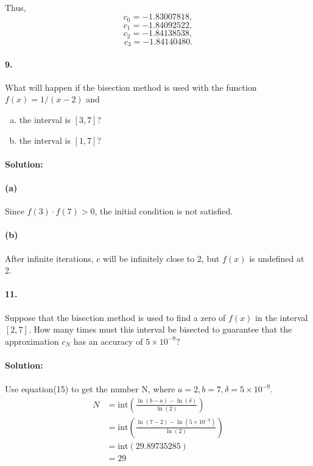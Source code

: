 \documentclass{article}  %
\begin{document}
        \paragraph{}Thus, $$c_0 = -1.83007818,$$ $$c_1 = -1.84092522,$$ $$c_2 = -1.84138538,$$ $$c_3 = -1.84140480.$$
        \paragraph{9.}What will happen if the bisection method is used with the function $f(x) = 1 / (x - 2)$ and
        \begin{enumerate}[(a)]
            \item the interval is $[3, 7]$?
            \item the interval is $[1, 7]$?
        \end{enumerate}
        \paragraph{Solution:}
        \paragraph{(a)}Since $f(3) \cdot f(7) > 0$, the initial condition is not satisfied.
        \paragraph{(b)}After infinite iterations, $c$ will be infinitely close to 2, but $f(x)$ is undefined at 2.
        \paragraph{11.} Suppose that the bisection method is used to find a zero of $f(x)$ in the interval $[2, 7]$. How many times must this interval be bisected to guarantee that the approximation $c_N$ has an accuracy of $5 \times 10^{-9}$?
        \paragraph{Solution:}
        \paragraph{}Use equation(15) to get the number N, where $a = 2, b = 7, \delta = 5 \times 10^{-9}.$
        \begin{align*}
        N &= \mathrm{int}\left(\frac{\ln{(b-a)}-\ln{(\delta)}}{\ln{(2)}}\right) \\
        &= \mathrm{int}\left(\frac{\ln{(7-2)}-\ln{(5 \times 10^{-9})}}{\ln{(2)}}\right) \\
        &= \mathrm{int}\left(29.89735285\right) \\
        &= 29
        \end{align*}
\end{document}

